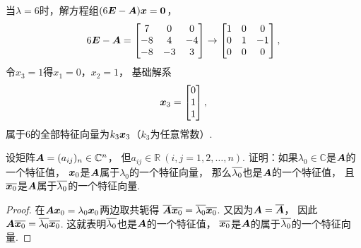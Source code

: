 \begin{example}
\begin{solution}
当\(\lambda=6\)时，解方程组\((6\boldsymbol{E}-\boldsymbol{A})\boldsymbol{x}=\boldsymbol0\)，\begin{equation*}
	6\boldsymbol{E}-\boldsymbol{A}
	= \begin{bmatrix} 7 & 0 & 0 \\ -8 & 4 & -4 \\ -8 & -3 & 3 \end{bmatrix}
	\to \begin{bmatrix} 1 & 0 & 0 \\ 0 & 1 & -1 \\ 0 & 0 & 0 \end{bmatrix},
\end{equation*}
令\(x_3=1\)得\(x_1=0\)，\(x_2=1\)，
基础解系\begin{equation*}
	\boldsymbol{x}_3 = \begin{bmatrix} 0 \\ 1 \\ 1 \end{bmatrix},
\end{equation*}
属于\(6\)的全部特征向量为\(k_3\boldsymbol{x}_3\)（\(k_3\)为任意常数）.
\end{solution}
\end{example}

\begin{example}
设矩阵\(\boldsymbol{A} = (a_{ij})_n \in \mathbb{C}^n\)，
但\(a_{ij} \in \mathbb{R}\ (i,j=1,2,\dotsc,n)\).
证明：如果\(\lambda_0\in\mathbb{C}\)是\(\boldsymbol{A}\)的一个特征值，
\(\boldsymbol{x}_0\)是\(\boldsymbol{A}\)属于\(\lambda_0\)的一个特征向量，
那么\(\overline{\lambda_0}\)也是\(\boldsymbol{A}\)的一个特征值，
且\(\overline{\boldsymbol{x}_0}\)是\(\boldsymbol{A}\)属于\(\overline{\lambda_0}\)的一个特征向量.
\begin{proof}
在\(\boldsymbol{A}\boldsymbol{x}_0=\lambda_0\boldsymbol{x}_0\)两边取共轭得
\(\overline{\boldsymbol{A}}\overline{\boldsymbol{x}_0}
=\overline{\lambda_0}\overline{\boldsymbol{x}_0}\).
又因为\(\boldsymbol{A}=\overline{\boldsymbol{A}}\)，
因此\(\boldsymbol{A}\overline{\boldsymbol{x}_0}=\overline{\lambda_0}\overline{\boldsymbol{x}_0}\).
这就表明\(\overline{\lambda_0}\)也是\(\boldsymbol{A}\)的一个特征值，
\(\overline{\boldsymbol{x}_0}\)是\(\boldsymbol{A}\)的属于\(\overline{\lambda_0}\)的一个特征向量.
\end{proof}
\end{example}

